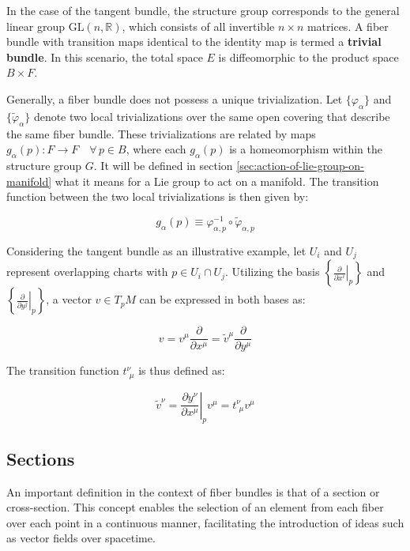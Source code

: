 In the case of the tangent bundle, the structure group corresponds to the general linear group \(\mathrm{GL}(n, \mathbb{R})\), which consists of all invertible \(n \times n\) matrices. 
A fiber bundle with transition maps identical to the identity map is termed a \textbf{trivial bundle}. In this scenario, the total space \(E\) is diffeomorphic to the product space \(B \times F\). 

Generally, a fiber bundle does not possess a unique trivialization. Let \(\{\varphi_\alpha\}\) and \(\{\tilde{\varphi}_\alpha\}\) denote two local trivializations over the same open covering that describe the same fiber bundle. These trivializations are related by maps \(g_\alpha(p) : F \to F \quad \forall\, p \in B\), where each \(g_\alpha(p)\) is a homeomorphism within the structure group \(G\). It will be defined in section \ref{sec:action-of-lie-group-on-manifold} what it means for a Lie group to act on a manifold. The transition function between the two local trivializations is then given by:

\[
g_\alpha(p) \equiv \varphi_{\alpha,p}^{-1} \circ \tilde{\varphi}_{\alpha,p}
\]

Considering the tangent bundle as an illustrative example\cite{NakaharaGeometrytopologyphysics2005}, let \(U_i\) and \(U_j\) represent overlapping charts with \(p \in U_i \cap U_j\). Utilizing the basis \(\left\{ \left. \frac{\partial}{\partial x^i} \right|_p \right\}\) and \(\left\{ \left. \frac{\partial}{\partial y^j} \right|_p \right\}\), a vector \(v \in T_pM\) can be expressed in both bases as:

\[
v = v^{\mu} \frac{\partial}{\partial x^{\mu}} = \tilde{v}^{\mu} \frac{\partial}{\partial y^{\mu}}
\]

The transition function \(t^\nu_{\,\,\mu}\) is thus defined as:

\[
\tilde{v}^\nu = \left.\frac{\partial y^\nu}{\partial x^\mu}\right|_p v^\mu = t^\nu_{\,\,\mu} v^\mu
\]

\subsection{Sections}

An important definition in the context of fiber bundles is that of a section or cross-section. This concept enables the selection of an element from each fiber over each point in a continuous manner, facilitating the introduction of ideas such as vector fields over spacetime\cite{NakaharaGeometrytopologyphysics2005}.

